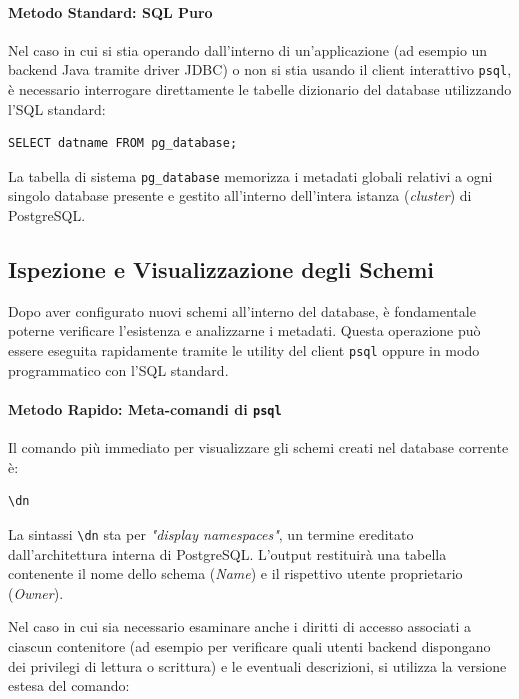 \paragraph{Metodo Standard: SQL Puro}

Nel caso in cui si stia operando dall'interno di un'applicazione (ad esempio un backend Java tramite driver JDBC) o non si stia usando il client interattivo \texttt{psql}, è necessario interrogare direttamente le tabelle dizionario del database utilizzando l'SQL standard:

\begin{lstlisting}[language=PostgreSQL, title=Query sul Catalogo di Sistema]
SELECT datname FROM pg_database;
\end{lstlisting}

La tabella di sistema \texttt{pg\_database} memorizza i metadati globali relativi a ogni singolo database presente e gestito all'interno dell'intera istanza (\textit{cluster}) di PostgreSQL.

\subsection{Ispezione e Visualizzazione degli Schemi}

Dopo aver configurato nuovi schemi all'interno del database, è fondamentale poterne verificare l'esistenza e analizzarne i metadati. Questa operazione può essere eseguita rapidamente tramite le utility del client \texttt{psql} oppure in modo programmatico con l'SQL standard.

\paragraph{Metodo Rapido: Meta-comandi di \texttt{psql}}

Il comando più immediato per visualizzare gli schemi creati nel database corrente è:

\begin{lstlisting}[language=bash, title=Meta-comando per l'elenco degli schemi]
\dn
\end{lstlisting}

La sintassi \texttt{\textbackslash dn} sta per \textit{"display namespaces"}, un termine ereditato dall'architettura interna di PostgreSQL. L'output restituirà una tabella contenente il nome dello schema (\textit{Name}) e il rispettivo utente proprietario (\textit{Owner}).

Nel caso in cui sia necessario esaminare anche i diritti di accesso associati a ciascun contenitore (ad esempio per verificare quali utenti backend dispongano dei privilegi di lettura o scrittura) e le eventuali descrizioni, si utilizza la versione estesa del comando:

